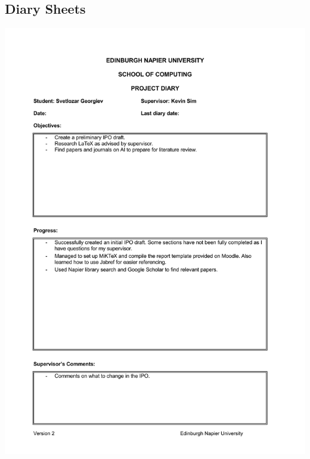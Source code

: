 \documentclass[12pt,a4paper]{article}
\begin{document}
\begin{appendices}
\section{Diary Sheets}
\includegraphics[width=\textwidth,height=\textheight,keepaspectratio]{week2.jpg} %
\newpage

\end{appendices}
\end{document}
